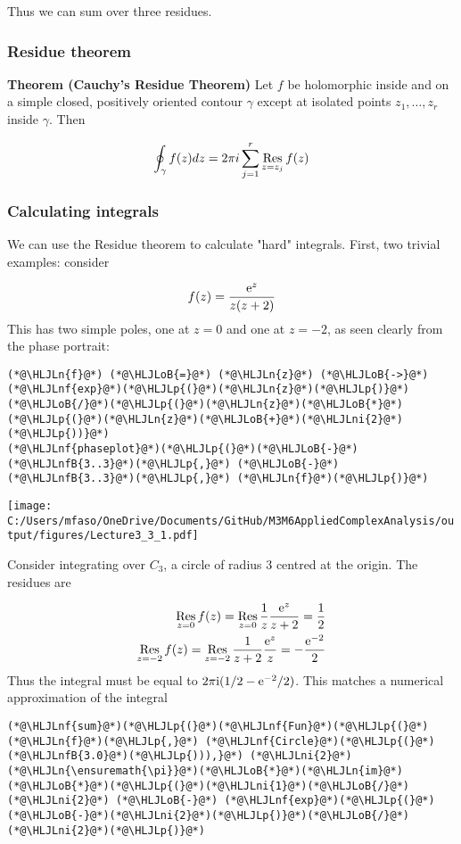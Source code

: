 \documentclass[12pt,a4paper]{article}
\newcommand{\HLJLn}[1]{#1}
\newcommand{\HLJLnf}[1]{\textcolor[RGB]{66,102,213}{#1}}
\newcommand{\HLJLnfB}[1]{\textcolor[RGB]{59,151,46}{#1}}
\newcommand{\HLJLni}[1]{\textcolor[RGB]{59,151,46}{#1}}
\newcommand{\HLJLoB}[1]{\textcolor[RGB]{102,102,102}{\textbf{#1}}}
\newcommand{\HLJLp}[1]{#1}
\def\I{ {\rm i} }
\def\E{ {\rm e} }
\def\Res_#1{\underset{#1}{\rm Res}\,}
\begin{document}
Thus we can sum over three residues.

\subsubsection{Residue theorem}
\textbf{Theorem (Cauchy's Residue Theorem)} Let $f$ be holomorphic inside and on a simple closed, positively oriented contour $\gamma$ except at isolated points $z_1, \ldots, z_r$ inside $\gamma$. Then

\[
\oint_\gamma f(z) dz = 2 \pi i \sum_{j=1}^r {\underset{z = z_j}{\rm Res}}\, f(z)
\]
\subsubsection{Calculating integrals}
We can use the Residue theorem to calculate "hard" integrals. First, two trivial examples: consider

\[
f(z) = {\E^z \over z (z+2)}
\]
This has two simple poles, one at $z=0$ and one at $z = -2$, as seen clearly from the phase portrait:


\begin{lstlisting}
(*@\HLJLn{f}@*) (*@\HLJLoB{=}@*) (*@\HLJLn{z}@*) (*@\HLJLoB{->}@*) (*@\HLJLnf{exp}@*)(*@\HLJLp{(}@*)(*@\HLJLn{z}@*)(*@\HLJLp{)}@*)(*@\HLJLoB{/}@*)(*@\HLJLp{(}@*)(*@\HLJLn{z}@*)(*@\HLJLoB{*}@*)(*@\HLJLp{(}@*)(*@\HLJLn{z}@*)(*@\HLJLoB{+}@*)(*@\HLJLni{2}@*)(*@\HLJLp{))}@*)
(*@\HLJLnf{phaseplot}@*)(*@\HLJLp{(}@*)(*@\HLJLoB{-}@*)(*@\HLJLnfB{3..3}@*)(*@\HLJLp{,}@*) (*@\HLJLoB{-}@*)(*@\HLJLnfB{3..3}@*)(*@\HLJLp{,}@*) (*@\HLJLn{f}@*)(*@\HLJLp{)}@*)
\end{lstlisting}

\texttt{[image: C:/Users/mfaso/OneDrive/Documents/GitHub/M3M6AppliedComplexAnalysis/output/figures/Lecture3\_3\_1.pdf]}

Consider integrating over $C_3$, a circle of radius 3 centred at the origin. The residues are


\begin{align*}
\Res_{z=0} f(z) = \Res_{z=0}  {1 \over z} {\E^z \over z+2} = {1 \over 2} \\
\Res_{z=-2} f(z) = \Res_{z=-2}  {1 \over z+2} {\E^z \over z} = -{\E^{-2} \over 2}
\end{align*}
Thus the integral must be equal to $2 \pi \I (1/2 - \E^{-2} /2)$. This matches a numerical approximation of the integral


\begin{lstlisting}
(*@\HLJLnf{sum}@*)(*@\HLJLp{(}@*)(*@\HLJLnf{Fun}@*)(*@\HLJLp{(}@*)(*@\HLJLn{f}@*)(*@\HLJLp{,}@*) (*@\HLJLnf{Circle}@*)(*@\HLJLp{(}@*)(*@\HLJLnfB{3.0}@*)(*@\HLJLp{))),}@*) (*@\HLJLni{2}@*)(*@\HLJLn{\ensuremath{\pi}}@*)(*@\HLJLoB{*}@*)(*@\HLJLn{im}@*)(*@\HLJLoB{*}@*)(*@\HLJLp{(}@*)(*@\HLJLni{1}@*)(*@\HLJLoB{/}@*)(*@\HLJLni{2}@*) (*@\HLJLoB{-}@*) (*@\HLJLnf{exp}@*)(*@\HLJLp{(}@*)(*@\HLJLoB{-}@*)(*@\HLJLni{2}@*)(*@\HLJLp{)}@*)(*@\HLJLoB{/}@*)(*@\HLJLni{2}@*)(*@\HLJLp{)}@*)
\end{lstlisting}
\end{document}
